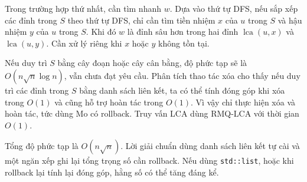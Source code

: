 \documentclass[11pt]{article}
\begin{document}
Trong trường hợp thứ nhất, cần tìm nhanh $w$. Dựa vào thứ tự DFS, nếu sắp xếp
các đỉnh trong $S$ theo thứ tự DFS, chỉ cần tìm tiền nhiệm $x$ của $u$ trong
$S$ và hậu nhiệm $y$ của $u$ trong $S$. Khi đó $w$ là đỉnh sâu hơn trong hai
đỉnh $\operatorname{lca}(u,x)$ và $\operatorname{lca}(u,y)$. Cần xử lý riêng
khi $x$ hoặc $y$ không tồn tại.

Nếu duy trì $S$ bằng cây đoạn hoặc cây cân bằng, độ phức tạp sẽ là
$O(n\sqrt n\log n)$, vẫn chưa đạt yêu cầu. Phân tích thao tác xóa cho thấy
nếu duy trì các đỉnh trong $S$ bằng danh sách liên kết, ta có thể tính đóng
góp khi xóa trong $O(1)$ và cũng hỗ trợ hoàn tác trong $O(1)$. Vì vậy chỉ
thực hiện xóa và hoàn tác, tức dùng Mo có rollback. Truy vấn LCA dùng
RMQ-LCA với thời gian $O(1)$.

Tổng độ phức tạp là $O(n\sqrt n)$. Lời giải chuẩn dùng danh sách liên kết tự
cài và một ngăn xếp ghi lại tổng trọng số cần rollback. Nếu dùng
\texttt{std::list}, hoặc khi rollback lại tính lại đóng góp, hằng số có thể
tăng đáng kể.
\end{document}
